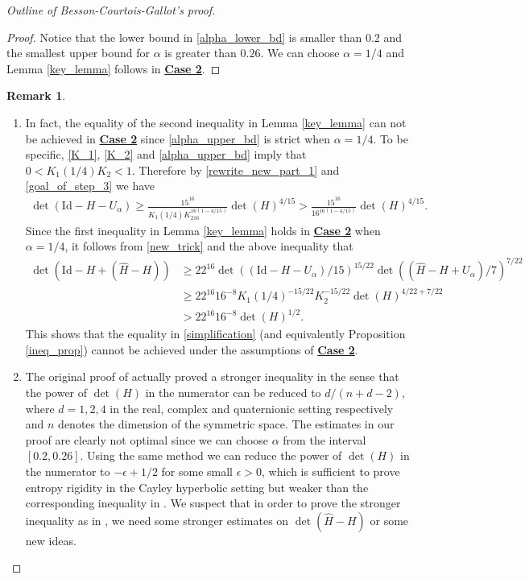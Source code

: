 \documentclass{article}
\newcommand{\id}{\mathrm{Id}}
\theoremstyle{definition}
\newtheorem*{rmk}{Remark}
\begin{document}
\begin{proof}[Outline of Besson-Courtois-Gallot's proof]
\begin{proof}
Notice that the lower bound in \eqref{alpha_lower_bd} is smaller than $0.2$ and the smallest upper bound for $\alpha $ is greater than $0.26$. We can choose $\alpha=1/4$ and Lemma \ref{key_lemma} follows in \hyperlink{case2}{\textbf{Case 2}}. 
\end{proof}
\begin{rmk}
\begin{enumerate}
\item[(1).] In fact, the equality of the second inequality in Lemma \ref{key_lemma} can not be achieved in \hyperlink{case2}{\textbf{Case 2}} since \eqref{alpha_upper_bd} is strict when $\alpha=1/4$. To be specific, \eqref{K_1}, \eqref{K_2} and \eqref{alpha_upper_bd} imply that $0<K_1(1/4)K_2<1$. Therefore by \eqref{rewrite_new_part_1} and \eqref{goal_of_step_3} we have
\begin{align*}
\det(\id-H-U_\alpha)\geq\frac{15^{16}}{K_1(1/4)K_216^{16(1-4/15)}}\det(H)^{4/15}>\frac{15^{16}}{16^{16(1-4/15)}}\det(H)^{4/15}.
\end{align*}
Since the first inequality in Lemma \ref{key_lemma} holds in \hyperlink{case2}{\textbf{Case 2}} when $\alpha=1/4$, it follows from \eqref{new_trick} and the above inequality that
\begin{align}\label{strict_ineq}
\det(\id-H+(\widehat{H}-H))&\geq22^{16}\det((\id-H-U_\alpha)/15)^{15/22}\det((\widehat{H}-H+U_\alpha)/7)^{7/22} \nonumber\\
&\geq 22^{16}16^{-8}K_1(1/4)^{-15/22}K_2^{-15/22}\det(H)^{4/22+7/22} \nonumber\\
&>22^{16}16^{-8}\det(H)^{1/2}.
\end{align}
This shows that the equality in \eqref{simplification} (and equivalently Proposition \ref{ineq_prop}) cannot be achieved under the assumptions of \hyperlink{case2}{\textbf{Case 2}}. 
\item[(2).] The original proof of \cite{BCG1} actually proved a stronger inequality in the sense that the power of $\det(H)$ in the numerator can be reduced to $d/(n+d-2)$, where $d=1,2,4$ in the real, complex and quaternionic setting respectively and $n$ denotes the dimension of the symmetric space. The estimates in our proof are clearly not optimal since we can choose $\alpha$ from the interval $[0.2,0.26]$. Using the same method we can reduce the power of $\det(H)$ in the numerator to $-\epsilon+1/2$ for some small $\epsilon>0$, which is sufficient to prove entropy rigidity in the Cayley hyperbolic setting but weaker than the corresponding inequality in \cite{BCG1}. We suspect that in order to prove the stronger inequality as in \cite{BCG1}, we need some stronger estimates on $\det(\widehat{H}-H)$ or some new ideas.
\end{enumerate}
\end{rmk}



\end{proof}
\end{document}
